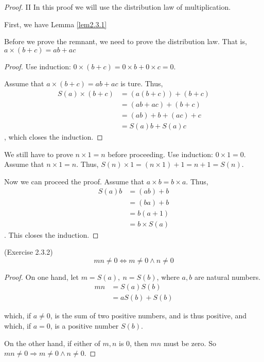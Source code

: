 \begin{proof} II In this proof we will use the distribution law of multiplication.

First, we have Lemma \ref{lem2.3.1}

Before we prove the remnant, we need to prove the distribution law. That 
is, $a \times (b+c) = ab + ac$ \label{distriLaw}
\begin{proof}
Use induction: $0 \times (b+c)= 0\times b+0\times c=0$.

Assume that $a \times (b+c) = ab + ac$ is ture. Thus, 
\begin{align*}
S(a) \times (b+c)
&= (a(b+c))+(b+c) \\
&= (ab+ac)+(b+c) \tag{By assumption} \\
&= (ab)+b+(ac)+c \\
&= S(a)b+S(a)c
\end{align*}, which closes the induction.
\end{proof}

We still have to prove $n \times 1 = n$ before proceeding. Use induction: $0 \times 1 = 0$. Assume that 
$n \times 1 = n$. Thus, $S(n) \times 1 = (n\times 1)+1=n+1=S(n)$.

Now we can proceed the proof. Assume that $a \times b = b \times a$. Thus, 
\begin{align*}
S(a)b
&= (ab)+b \\
&= (ba)+b \tag{By assumption} \\
&= b(a+1) \tag{By $b\times 1=b$ and the distribution law}\\
&= b \times S(a)
\end{align*}. This closes the induction.
\end{proof}

\begin{lem} \label{lem2.3.3}
(Exercise 2.3.2) \label{exercise2.3.2}
\[mn \neq 0 \Longleftrightarrow m \neq 0 \wedge n \neq 0\]
\end{lem}

\begin{proof}
On one hand,
let $m=S(a),\ n=S(b)$, where $a,b$ are natural numbers.
\begin{align*}
mn 
&= S(a)S(b) \\
&= aS(b) + S(b)
\end{align*}

which, if $a \neq 0$, is the sum of two positive numbers, and is thus positive, and which, if $a = 0$,
is a positive number $S(b)$.

On the other hand, if either of $m,n$ is 0, then $mn$ must be zero. So $mn \neq 0 \Longrightarrow m \neq 0 
\wedge n \neq 0$.
\end{proof}

